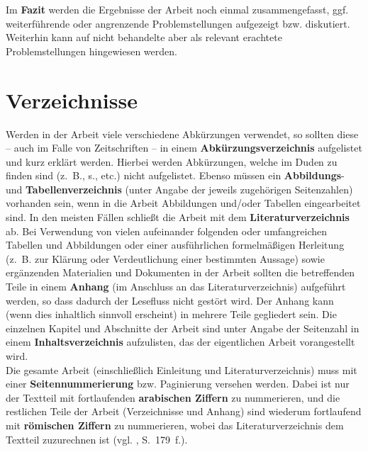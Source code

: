 Im \textbf{Fazit} werden die Ergebnisse der Arbeit noch
einmal zusammengefasst, ggf. weiterführende oder angrenzende Problemstellungen aufgezeigt bzw. diskutiert. Weiterhin
kann auf nicht behandelte aber als relevant erachtete Problemstellungen hingewiesen werden.

\section{Verzeichnisse}
\label{chap:verzeichnisse}
Werden in der Arbeit viele verschiedene Abkürzungen verwendet, so sollten diese -- auch im Falle von Zeitschriften --
in einem \textbf{Abkürzungsverzeichnis} aufgelistet und
kurz erklärt werden. Hierbei werden Abkürzungen, welche im Duden zu finden sind (\glqq z.~B.\grqq , \glqq s.\grqq, etc.) nicht aufgelistet.
 Ebenso müssen ein
\textbf{Abbildungs}-
und \textbf{Tabellenverzeichnis} (unter Angabe der jeweils
zugehörigen Seitenzahlen) vorhanden sein, wenn in die Arbeit Abbildungen und/oder Tabellen eingearbeitet sind.
In den meisten Fällen schließt die Arbeit mit dem
\textbf{Literaturverzeichnis} ab. Bei Verwendung von vielen
aufeinander folgenden oder umfangreichen Tabellen und Abbildungen oder einer ausführlichen formelmäßigen Herleitung
(z.~B. zur Klärung oder Verdeutlichung einer bestimmten Aussage) sowie ergänzenden Materialien und Dokumenten in der
Arbeit sollten die betreffenden Teile in einem \textbf{Anhang} (im Anschluss an das
Literaturverzeichnis) aufgeführt werden, so dass dadurch der Lesefluss nicht gestört wird. Der Anhang kann (wenn dies
inhaltlich sinnvoll erscheint) in mehrere Teile gegliedert sein. Die einzelnen Kapitel und Abschnitte der Arbeit sind
unter Angabe der Seitenzahl in einem \textbf{Inhaltsverzeichnis}
aufzulisten, das der eigentlichen Arbeit vorangestellt wird.\\

Die gesamte Arbeit (einschließlich Einleitung und Literaturverzeichnis) muss mit einer
\textbf{Seitennummerierung} bzw. Paginierung
versehen werden. Dabei ist nur der Textteil mit fortlaufenden \textbf{arabischen Ziffern} zu
nummerieren, und die restlichen Teile der Arbeit (Verzeichnisse und Anhang) sind wiederum fortlaufend mit
\textbf{römischen Ziffern} zu nummerieren, wobei das Literaturverzeichnis dem Textteil zuzurechnen ist (vgl.
\cite{Theisen2006}, S.~179~f.).\\

